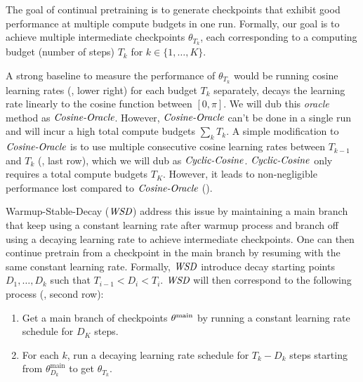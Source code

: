 The goal of continual pretraining is to generate checkpoints that exhibit good performance at multiple compute budgets in one run. Formally, our goal is to achieve multiple intermediate checkpoints $\theta_{T_k}$, each corresponding to a computing budget (number of steps) $T_k$ for $k \in \{1, \ldots, K\}$.

A strong baseline to measure the performance of $\theta_{T_k}$ would be running cosine learning rates (, lower right) for each budget $T_k$ separately,  decays the learning rate linearly to the cosine function between $[0, \pi]$.  We will dub this \emph{oracle} method as \textbf{$\textit{Cosine-Oracle}$}. However, $\textit{Cosine-Oracle}$ can't be done in a single run and will incur a high total compute budgets $\sum_{k} T_k$. A simple modification to $\textit{Cosine-Oracle}$ is to use multiple consecutive cosine learning rates between $T_{k-1}$ and $T_k$ (, last row), which we will dub as \textbf{$\textit{Cyclic-Cosine}$}. $\textit{Cyclic-Cosine}$ only requires a total compute budgets $T_K$. However, it leads to non-negligible performance lost compared to $\textit{Cosine-Oracle}$ (\cite{hu2024minicpm}).

Warmup-Stable-Decay (\textbf{$\textit{WSD}$}) address this issue by maintaining a {main branch} that keep using a constant learning rate after warmup process and branch off using a decaying learning rate to achieve intermediate checkpoints. One can then continue pretrain from a checkpoint in the main branch by resuming with the same constant learning rate. Formally, $\textit{WSD}$ introduce decay starting points $D_1, \ldots, D_k$ such that $T_{i - 1} < D_{i} < T_{i}$. $\textit{WSD}$ will then correspond to the following process (, second row):
\begin{enumerate}[leftmargin=*]
    \item Get a main branch of checkpoints ${\theta^{\mathrm{main}}}$ by running a constant learning rate schedule for $D_K$ steps.
    \item For each $k$, run a decaying learning rate schedule for $T_k - D_k$ steps starting from $\theta^{\mathrm{main}}_{D_k}$ to get $\theta_{T_k}$.
\end{enumerate}

